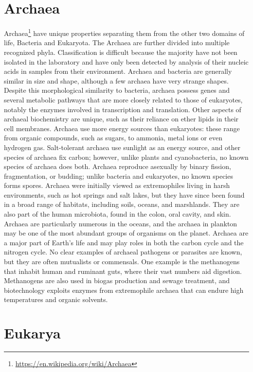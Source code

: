 \documentclass[]{book}
\let\rmarkdownfootnote\footnote%
\def\footnote{\protect\rmarkdownfootnote}
\renewcommand{\href}[2]{#2\footnote{\url{#1}}}
\begin{document}
\hypertarget{archaea}{%
\section{Archaea}\label{archaea}}

\href{https://en.wikipedia.org/wiki/Archaea}{Archaea} have unique properties separating them from the other two domains of life, Bacteria and Eukaryota. The Archaea are further divided into multiple recognized phyla. Classification is difficult because the majority have not been isolated in the laboratory and have only been detected by analysis of their nucleic acids in samples from their environment.
Archaea and bacteria are generally similar in size and shape, although a few archaea have very strange shapes. Despite this morphological similarity to bacteria, archaea possess genes and several metabolic pathways that are more closely related to those of eukaryotes, notably the enzymes involved in transcription and translation. Other aspects of archaeal biochemistry are unique, such as their reliance on ether lipids in their cell membranes. Archaea use more energy sources than eukaryotes: these range from organic compounds, such as sugars, to ammonia, metal ions or even hydrogen gas. Salt-tolerant archaea use sunlight as an energy source, and other species of archaea fix carbon; however, unlike plants and cyanobacteria, no known species of archaea does both. Archaea reproduce asexually by binary fission, fragmentation, or budding; unlike bacteria and eukaryotes, no known species forms spores.
Archaea were initially viewed as extremophiles living in harsh environments, such as hot springs and salt lakes, but they have since been found in a broad range of habitats, including soils, oceans, and marshlands. They are also part of the human microbiota, found in the colon, oral cavity, and skin. Archaea are particularly numerous in the oceans, and the archaea in plankton may be one of the most abundant groups of organisms on the planet. Archaea are a major part of Earth's life and may play roles in both the carbon cycle and the nitrogen cycle. No clear examples of archaeal pathogens or parasites are known, but they are often mutualists or commensals. One example is the methanogens that inhabit human and ruminant guts, where their vast numbers aid digestion. Methanogens are also used in biogas production and sewage treatment, and biotechnology exploits enzymes from extremophile archaea that can endure high temperatures and organic solvents.

\hypertarget{eukarya}{%
\section{Eukarya}\label{eukarya}}
\end{document}
